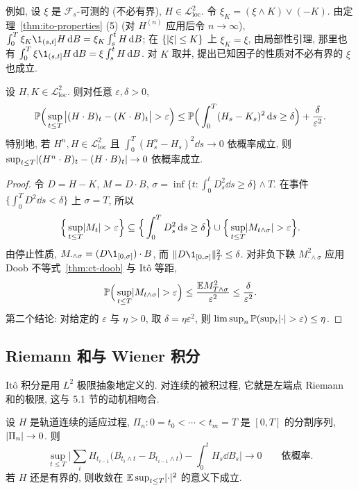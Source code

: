 例如, 设 $\xi$ 是 $\mathcal{F}_s$-可测的 (不必有界), $H\in\mathscr{L}^2_{\mathrm{loc}}$. 令 $\xi_K=(\xi\wedge K)\vee(-K)$. 由定理~\ref{thm:ito-properties} (5) (对 $H^{(n)}$ 应用后令 $n\to\infty$), $\int_0^T\xi_K\1_{(s,t]}H\dd B=\xi_K\int_s^tH\dd B$; 在 $\{\lvert\xi\rvert\le K\}$ 上 $\xi_K=\xi$, 由局部性引理, 那里也有 $\int_0^T\xi\1_{(s,t]}H\dd B=\xi\int_s^tH\dd B$. 对 $K$ 取并, 提出已知因子的性质对不必有界的 $\xi$ 也成立.

\begin{lemma}[依概率收敛]\label{lem:ito-prob}
设 $H,K\in\mathscr{L}^2_{\mathrm{loc}}$. 则对任意 $\varepsilon,\delta>0$,
\[
\mathbb{P}\Big(\sup_{t\le T}\big\lvert(H\cdot B)_t-(K\cdot B)_t\big\rvert>\varepsilon\Big)\le\mathbb{P}\Big(\int_0^T(H_s-K_s)^2\mathop{}\!\mathrm{d} s\ge\delta\Big)+\frac{\delta}{\varepsilon^2}.
\]
特别地, 若 $H^n,H\in\mathscr{L}^2_{\mathrm{loc}}$ 且 $\int_0^T(H^n_s-H_s)^2\dd s\to0$ 依概率成立, 则 $\sup_{t\le T}\lvert(H^n\cdot B)_t-(H\cdot B)_t\rvert\to0$ 依概率成立.
\end{lemma}

\begin{proof}
令 $D=H-K$, $M=D\cdot B$, $\sigma=\inf\{t: \int_0^tD_s^2\dd s\ge\delta\}\wedge T$. 在事件 $\{\int_0^TD^2\dd s<\delta\}$ 上 $\sigma=T$, 所以
\[
\Big\{\sup_{t\le T}\lvert M_t\rvert>\varepsilon\Big\}\subseteq\Big\{\int_0^TD_s^2\mathop{}\!\mathrm{d} s\ge\delta\Big\}\cup\Big\{\sup_{t\le T}\lvert M_{t\wedge\sigma}\rvert>\varepsilon\Big\}.
\]
由停止性质, $M_{\cdot\wedge\sigma}=(D\1_{[0,\sigma]})\cdot B$, 而 $\norm{D\1_{[0,\sigma]}}_T^2\le\delta$. 对非负下鞅 $M_{\cdot\wedge\sigma}^2$ 应用 Doob 不等式~\ref{thm:ct-doob} 与 It\^o 等距,
\[
\mathbb{P}\Big(\sup_{t\le T}\lvert M_{t\wedge\sigma}\rvert>\varepsilon\Big)\le\frac{\mathbb{E} M_{T\wedge\sigma}^2}{\varepsilon^2}\le\frac{\delta}{\varepsilon^2}.
\]
第二个结论: 对给定的 $\varepsilon$ 与 $\eta>0$, 取 $\delta=\eta\varepsilon^2$, 则 $\limsup_n\mathbb{P}(\sup_t\lvert\cdot\rvert>\varepsilon)\le\eta$.
\end{proof}

\subsection{Riemann 和与 Wiener 积分}

It\^o 积分是用 $L^2$ 极限抽象地定义的. 对连续的被积过程, 它就是左端点 Riemann 和的极限, 这与 5.1 节的动机相吻合.

\begin{proposition}\label{prop:riemann-approx}
设 $H$ 是轨道连续的适应过程, $\Pi_n: 0=t_0<\cdots<t_m=T$ 是 $[0,T]$ 的分割序列, $\lvert\Pi_n\rvert\to0$. 则
\[
\sup_{t\le T}\Big\lvert\sum_{i}H_{t_{i-1}}\big(B_{t_i\wedge t}-B_{t_{i-1}\wedge t}\big)-\int_0^tH_s\dd B_s\Big\rvert\to0\qquad\text{依概率}.
\]
若 $H$ 还是有界的, 则收敛在 $\mathbb{E}\sup_{t\le T}\lvert\cdot\rvert^2$ 的意义下成立.
\end{proposition}


